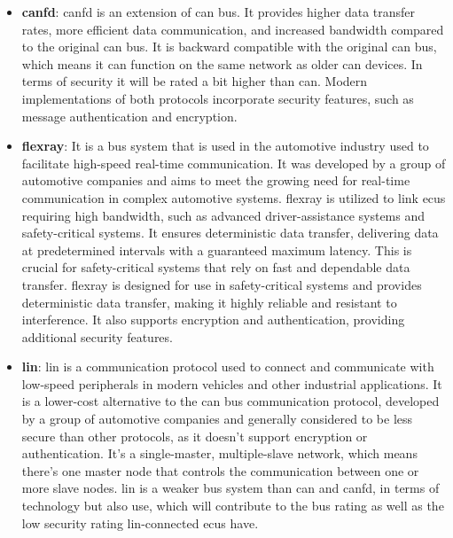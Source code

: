 \begin{itemize}
    \item \textbf{\acrlong{canfd}}: \acrshort{canfd} is an extension of \acrshort{can} bus.
    It provides higher data transfer rates, more efficient data communication, and increased bandwidth compared to the original \acrshort{can} bus.
    It is backward compatible with the original \acrshort{can} bus, which means it can function on the same network as older \acrshort{can} devices.
    In terms of security it will be rated a bit higher than \acrshort{can}.
    Modern implementations of both protocols incorporate security features, such as message authentication and encryption.
    
    \item \textbf{\acrshort{flexray}}: It is a bus system that is used in the automotive industry used to facilitate high-speed real-time communication.
    It was developed by a group of automotive companies and aims to meet the growing need for real-time communication in complex automotive systems.
    \acrshort{flexray} is utilized to link \acrshort{ecu}s requiring high bandwidth, such as advanced driver-assistance systems and safety-critical systems. 
    It ensures deterministic data transfer, delivering data at predetermined intervals with a guaranteed maximum latency. 
    This is crucial for safety-critical systems that rely on fast and dependable data transfer.
    \acrshort{flexray} is designed for use in safety-critical systems and provides deterministic data transfer, making it highly reliable and resistant to interference. 
    It also supports encryption and authentication, providing additional security features.

    \item \textbf{\acrlong{lin}}: \acrshort{lin} is a communication protocol used to connect and communicate with low-speed peripherals in modern vehicles and other industrial applications. 
    It is a lower-cost alternative to the \acrshort{can} bus communication protocol, developed by a group of automotive companies 
    and generally considered to be less secure than other protocols, as it doesn't support encryption or authentication.
    It's a single-master, multiple-slave network, which means there's one master node that controls the communication between one or more slave nodes.
    \acrshort{lin} is a weaker bus system than \acrshort{can} and \acrshort{canfd}, in terms of technology but also use, which will contribute to the bus rating 
    as well as the low security rating \acrshort{lin}-connected \acrshort{ecu}s have.
    

\end{itemize}
